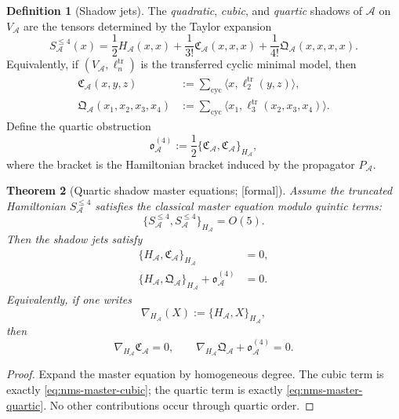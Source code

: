 \documentclass[11pt,oneside]{memoir}
\numberwithin{equation}{chapter}
\newtheorem{theorem}{Theorem}[chapter]
\theoremstyle{definition}
\newtheorem{definition}[theorem]{Definition}
\newcommand{\ClaimStatusProvedHere}{\textnormal{[formal]}}
\newcommand{\cA}{\mathcal A}
\begin{document}
\begin{definition}[Shadow jets]
\label{def:nms-shadow-jets}
The \emph{quadratic}, \emph{cubic}, and \emph{quartic} shadows of $\cA$ on $V_{\cA}$ are the tensors determined by the Taylor expansion
\begin{equation}
\label{eq:nms-shadow-potential-expansion}
S_{\cA}^{\le 4}(x)
=
\frac12H_{\cA}(x,x)
+
\frac1{3!}\mathfrak C_{\cA}(x,x,x)
+
\frac1{4!}\mathfrak Q_{\cA}(x,x,x,x).
\end{equation}
Equivalently, if $(V_{\cA},\ell_n^{\mathrm{tr}})$ is the transferred cyclic minimal model, then
\begin{align}
\mathfrak C_{\cA}(x,y,z)
&:= \sum_{\mathrm{cyc}}\langle x,\ell_2^{\mathrm{tr}}(y,z)\rangle,
\label{eq:nms-cubic-shadow}
\\
\mathfrak Q_{\cA}(x_1,x_2,x_3,x_4)
&:= \sum_{\mathrm{cyc}}\langle x_1,\ell_3^{\mathrm{tr}}(x_2,x_3,x_4)\rangle.
\label{eq:nms-quartic-shadow}
\end{align}
Define the quartic obstruction
\begin{equation}
\label{eq:nms-quartic-obstruction-def}
\mathfrak o_{\cA}^{(4)}
:=
\frac12\{\mathfrak C_{\cA},\mathfrak C_{\cA}\}_{H_{\cA}},
\end{equation}
where the bracket is the Hamiltonian bracket induced by the propagator $P_{\cA}$.
\end{definition}

\begin{theorem}[Quartic shadow master equations; \ClaimStatusProvedHere]
\label{thm:nms-shadow-master-equations}
Assume the truncated Hamiltonian $S_{\cA}^{\le 4}$ satisfies the classical master equation modulo quintic terms:
\[
\{S_{\cA}^{\le 4},S_{\cA}^{\le 4}\}_{H_{\cA}}=O(5).
\]
Then the shadow jets satisfy
\begin{align}
\{H_{\cA},\mathfrak C_{\cA}\}_{H_{\cA}} &= 0,
\label{eq:nms-master-cubic}
\\
\{H_{\cA},\mathfrak Q_{\cA}\}_{H_{\cA}} + \mathfrak o_{\cA}^{(4)} &= 0.
\label{eq:nms-master-quartic}
\end{align}
Equivalently, if one writes
\[
\nabla_{H_{\cA}}(X):=\{H_{\cA},X\}_{H_{\cA}},
\]
then
\[
\nabla_{H_{\cA}}\mathfrak C_{\cA}=0,
\qquad
\nabla_{H_{\cA}}\mathfrak Q_{\cA}+\mathfrak o_{\cA}^{(4)}=0.
\]
\end{theorem}

\begin{proof}
Expand the master equation by homogeneous degree.  The cubic term is exactly \eqref{eq:nms-master-cubic}; the quartic term is exactly \eqref{eq:nms-master-quartic}.  No other contributions occur through quartic order.\qedhere
\end{proof}
\end{document}
